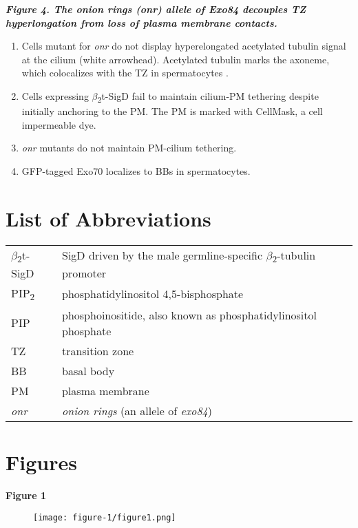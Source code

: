 \documentclass[12pt, twoside, letterpaper]{article}
\newcommand{\PIP}{PIP\textsubscript{2}}
\newcommand{\sigd}{$\beta$\textsubscript{2}t-SigD}
\begin{document}
\begin{doublespacing}
\begin{linenumbers}
    \textbf{\itshape Figure 4. The \textit{onion rings} (\textit{onr}) allele of Exo84 decouples TZ hyperlongation from loss of plasma membrane contacts.}
    \begin{enumerate}[label={(\Alph*)}, nolistsep]
    \item Cells mutant for \textit{onr} do not display hyperelongated acetylated tubulin signal at the cilium (white arrowhead).
      Acetylated tubulin marks the axoneme, which colocalizes with the TZ in spermatocytes \citep{pratt2016drosophila}.
    \item Cells expressing \sigd{} fail to maintain cilium-PM tethering despite initially anchoring to the PM.
      The PM is marked with CellMask, a cell impermeable dye.
    \item \textit{onr} mutants do not maintain PM-cilium tethering.
    \item GFP-tagged Exo70 localizes to BBs in spermatocytes.
    \end{enumerate}
    
  \end{linenumbers}


    \section*{List of Abbreviations}
    \begin{tabular}{ll}
       \sigd{} & SigD driven by the male germline-specific $\beta$\textsubscript{2}-tubulin promoter \\
       \PIP{} & phosphatidylinositol 4,5-bisphosphate \\
      PIP & phosphoinositide, also known as phosphatidylinositol phosphate \\
       TZ & transition zone \\
       BB & basal body \\
       PM & plasma membrane \\ 
       \textit{onr} & \textit{onion rings} (an allele of \textit{exo84})
    \end{tabular}
\end{doublespacing}



\newpage

\section*{Figures}

\textbf{Figure 1}
\begin{figure}[ht]
  \texttt{[image: figure-1/figure1.png]}
\end{figure}
\newpage
\end{document}
